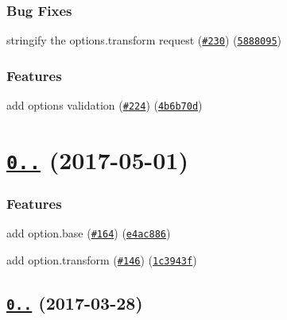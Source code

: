\subsubsection*{Bug Fixes}


\begin{DoxyItemize}
\item stringify the options.\+transform request (\href{https://github.com/webpack/style-loader/issues/230}{\tt \#230}) (\href{https://github.com/webpack/style-loader/commit/5888095}{\tt 5888095})
\end{DoxyItemize}

\subsubsection*{Features}


\begin{DoxyItemize}
\item add options validation (\href{https://github.com/webpack/style-loader/issues/224}{\tt \#224}) (\href{https://github.com/webpack/style-loader/commit/4b6b70d}{\tt 4b6b70d})
\end{DoxyItemize}

\label{_0.17.0}%
 \section*{\href{https://github.com/webpack/style-loader/compare/v0.16.1...v0.17.0}{\tt 0..} (2017-\/05-\/01)}

\subsubsection*{Features}


\begin{DoxyItemize}
\item add option.\+base (\href{https://github.com/webpack/style-loader/issues/164}{\tt \#164}) (\href{https://github.com/webpack/style-loader/commit/e4ac886}{\tt e4ac886})
\item add option.\+transform (\href{https://github.com/webpack/style-loader/issues/146}{\tt \#146}) (\href{https://github.com/webpack/style-loader/commit/1c3943f}{\tt 1c3943f})
\end{DoxyItemize}

\label{_0.16.1}%
 \subsection*{\href{https://github.com/webpack/style-loader/compare/v0.16.0...v0.16.1}{\tt 0..} (2017-\/03-\/28)}

